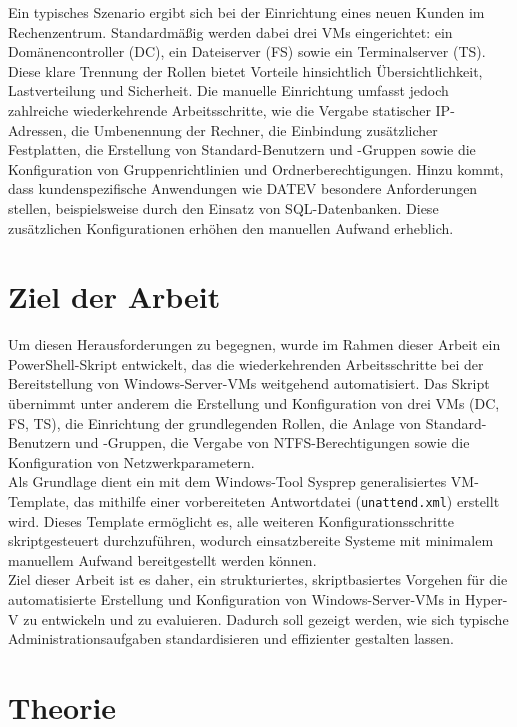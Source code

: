 \documentclass[a4paper,12pt]{article}
\begin{document}
Ein typisches Szenario ergibt sich bei der Einrichtung eines neuen Kunden im Rechenzentrum. Standardmäßig werden dabei drei VMs eingerichtet: ein Domänencontroller (DC), ein Dateiserver (FS) sowie ein Terminalserver (TS). Diese klare Trennung der Rollen bietet Vorteile hinsichtlich Übersichtlichkeit, Lastverteilung und Sicherheit.
Die manuelle Einrichtung umfasst jedoch zahlreiche wiederkehrende Arbeitsschritte, wie die Vergabe statischer IP-Adressen, die Umbenennung der Rechner, die Einbindung zusätzlicher Festplatten, die Erstellung von Standard-Benutzern und -Gruppen sowie die Konfiguration von Gruppenrichtlinien und Ordnerberechtigungen.
Hinzu kommt, dass kundenspezifische Anwendungen wie DATEV besondere Anforderungen stellen, beispielsweise durch den Einsatz von SQL-Datenbanken. Diese zusätzlichen Konfigurationen erhöhen den manuellen Aufwand erheblich.\\

\section{Ziel der Arbeit}

Um diesen Herausforderungen zu begegnen, wurde im Rahmen dieser Arbeit ein PowerShell-Skript entwickelt, das die wiederkehrenden Arbeitsschritte bei der Bereitstellung von Windows-Server-VMs weitgehend automatisiert. Das Skript übernimmt unter anderem die Erstellung und Konfiguration von drei VMs (DC, FS, TS), die Einrichtung der grundlegenden Rollen, die Anlage von Standard-Benutzern und -Gruppen, die Vergabe von NTFS-Berechtigungen sowie die Konfiguration von Netzwerkparametern.\\

Als Grundlage dient ein mit dem Windows-Tool Sysprep generalisiertes VM-Template, das mithilfe einer vorbereiteten Antwortdatei (\lstinline|unattend.xml|) erstellt wird. Dieses Template ermöglicht es, alle weiteren Konfigurationsschritte skriptgesteuert durchzuführen, wodurch einsatzbereite Systeme mit minimalem manuellem Aufwand bereitgestellt werden können.\\

Ziel dieser Arbeit ist es daher, ein strukturiertes, skriptbasiertes Vorgehen für die automatisierte Erstellung und Konfiguration von Windows-Server-VMs in Hyper-V zu entwickeln und zu evaluieren. Dadurch soll gezeigt werden, wie sich typische Administrationsaufgaben standardisieren und effizienter gestalten lassen.\\

\section{Theorie}
\end{document}
